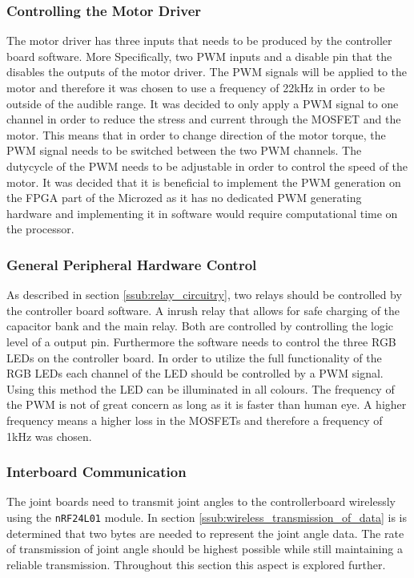 \subsubsection{Controlling the Motor Driver} %
\label{ssub:controlling_the_motor_driver}
The motor driver has three inputs that needs to be produced by the controller board software.
More Specifically, two PWM inputs and a disable pin that the disables the outputs of the motor driver.
The PWM signals will be applied to the motor and therefore it was chosen to use a frequency of 22kHz in order to be outside of the audible range.
It was decided to only apply a PWM signal to one channel in order to reduce the stress and current through the MOSFET and the motor.
This means that in order to change direction of the motor torque, the PWM signal needs to be switched between the two PWM channels.
The dutycycle of the PWM needs to be adjustable in order to control the speed of the motor.
It was decided that it is beneficial to implement the PWM generation on the FPGA part of the Microzed as it has no dedicated PWM generating hardware and implementing it in software would require computational time on the processor.

\subsubsection{General Peripheral Hardware Control} %
\label{ssub:general_peripheral_hardware}
As described in section \ref{ssub:relay_circuitry}, two relays should be controlled by the controller board software. 
A inrush relay that allows for safe charging of the capacitor bank and the main relay. 
Both are controlled by controlling the logic level of a output pin.
Furthermore the software needs to control the three RGB LEDs on the controller board. 
In order to utilize the full functionality of the RGB LEDs each channel of the LED should be controlled by a PWM signal.
Using this method the LED can be illuminated in all colours.
The frequency of the PWM is not of great concern as long as it is faster than human eye. 
A higher frequency means a higher loss in the MOSFETs and therefore a frequency of 1kHz was chosen.



\subsubsection{Interboard Communication} %
\label{ssub:interboard_communication}
The joint boards need to transmit joint angles to the controllerboard wirelessly using the \texttt{nRF24L01} module.
In section  \ref{ssub:wireless_transmission_of_data} is is determined that two bytes are needed to represent the joint angle data.
The rate of transmission of joint angle should be highest possible while still maintaining a reliable transmission.
Throughout this section this aspect is explored further.

